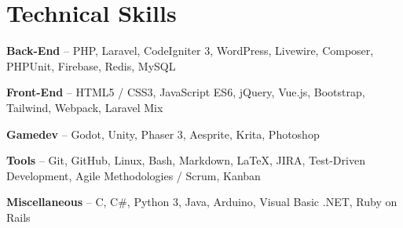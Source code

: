 \section{Technical Skills}
\begin{small}
	\parbox[t][][t]{\linewidth}{
		\textbf{Back-End} -- PHP, Laravel, CodeIgniter 3, WordPress, Livewire, Composer, PHPUnit, Firebase, Redis, MySQL
		\smallbreak
	}
	\parbox[t][][t]{\linewidth}{
		\textbf{Front-End} -- HTML5 / CSS3, JavaScript ES6, jQuery, Vue.js, Bootstrap, Tailwind, Webpack, Laravel Mix
		\smallbreak
	}
	\parbox[t][][t]{\linewidth}{
		\textbf{Gamedev} -- Godot, Unity, Phaser 3, Aesprite, Krita, Photoshop
		\smallbreak
	}
	\parbox[t][][t]{\linewidth}{
		\textbf{Tools} -- Git, GitHub, Linux, Bash, Markdown, LaTeX, JIRA, Test-Driven Development, Agile Methodologies / Scrum, Kanban
		\smallbreak
	}
	\parbox[t][][t]{\linewidth}{
		\textbf{Miscellaneous} -- C, C\#, Python 3, Java, Arduino, Visual Basic .NET, Ruby on Rails
	}
\end{small}
